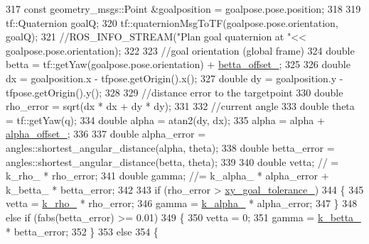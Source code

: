 \begin{DoxyCode}
{317     \textcolor{keyword}{const} geometry\_msgs::Point &goalposition = goalpose.pose.position;
318 
319     tf::Quaternion goalQ;
320     tf::quaternionMsgToTF(goalpose.pose.orientation, goalQ);
321     \textcolor{comment}{//ROS\_INFO\_STREAM("Plan goal quaternion at "<< goalpose.pose.orientation);}
322 
323     \textcolor{comment}{//goal orientation (global frame)}
324     \textcolor{keywordtype}{double} betta = tf::getYaw(goalpose.pose.orientation) + \hyperlink{classcl__move__base__z_1_1forward__local__planner_1_1ForwardLocalPlanner_a935db3e785e3276d42b34d58011e793c}{betta\_offset\_};
325 
326     \textcolor{keywordtype}{double} dx = goalposition.x - tfpose.getOrigin().x();
327     \textcolor{keywordtype}{double} dy = goalposition.y - tfpose.getOrigin().y();
328 
329     \textcolor{comment}{//distance error to the targetpoint}
330     \textcolor{keywordtype}{double} rho\_error = sqrt(dx * dx + dy * dy);
331 
332     \textcolor{comment}{//current angle}
333     \textcolor{keywordtype}{double} theta = tf::getYaw(q);
334     \textcolor{keywordtype}{double} alpha = atan2(dy, dx);
335     alpha = alpha + \hyperlink{classcl__move__base__z_1_1forward__local__planner_1_1ForwardLocalPlanner_a3d1b7e2ddf54efd67e4935875c7b6a67}{alpha\_offset\_};
336 
337     \textcolor{keywordtype}{double} alpha\_error = angles::shortest\_angular\_distance(alpha, theta);
338     \textcolor{keywordtype}{double} betta\_error = angles::shortest\_angular\_distance(betta, theta);
339 
340     \textcolor{keywordtype}{double} vetta; \textcolor{comment}{// = k\_rho\_ * rho\_error;}
341     \textcolor{keywordtype}{double} gamma; \textcolor{comment}{//= k\_alpha\_ * alpha\_error + k\_betta\_ * betta\_error;}
342 
343     \textcolor{keywordflow}{if} (rho\_error > \hyperlink{classcl__move__base__z_1_1forward__local__planner_1_1ForwardLocalPlanner_acd2ed91ee166f03faeeb9d6a4b91084b}{xy\_goal\_tolerance\_})
344     \{
345         vetta = \hyperlink{classcl__move__base__z_1_1forward__local__planner_1_1ForwardLocalPlanner_a8ad1b04b0bdaa8a7bb878f5e5cebd4f8}{k\_rho\_} * rho\_error;
346         gamma = \hyperlink{classcl__move__base__z_1_1forward__local__planner_1_1ForwardLocalPlanner_a530117a51f06e426b6aacc08bbd38fff}{k\_alpha\_} * alpha\_error;
347     \}
348     \textcolor{keywordflow}{else} \textcolor{keywordflow}{if} (fabs(betta\_error) >= 0.01)
349     \{
350         vetta = 0;
351         gamma = \hyperlink{classcl__move__base__z_1_1forward__local__planner_1_1ForwardLocalPlanner_a7b89ccccd288e5384154e7d5b64b4014}{k\_betta\_} * betta\_error;
352     \}
353     \textcolor{keywordflow}{else}
354     \{
}
\end{DoxyCode}
